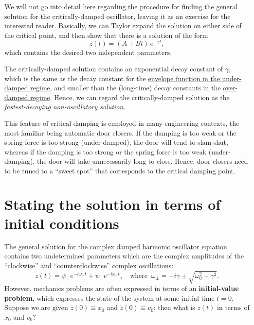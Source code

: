 \documentclass[10pt,a4paper]{article}
\begin{document}
We will not go into detail here regarding the procedure for finding
the general solution for the critically-damped oscillator, leaving it
as an exercise for the interested reader.  Basically, we can Taylor
expand the solution on either side of the critical point, and then
show that there is a solution of the form
\begin{equation}
  z(t) = \left(A + B t\right)\, e^{-\gamma t},
\end{equation}
which contains the desired two independent parameters.

The critically-damped solution contains an exponential decay constant
of $\gamma$, which is the same as the decay constant for the
\hyperref[under-damped-motion]{envelope function in the under-damped
  regime}, and smaller than the (long-time) decay constants in the
\hyperref[over-damped-motion]{over-damped regime}. Hence, we can
regard the critically-damped solution as the \emph{fastest-decaying
  non-oscillatory solution}.

This feature of critical damping is employed in many engineering
contexts, the most familiar being automatic door closers. If the
damping is too weak or the spring force is too strong (under-damped),
the door will tend to slam shut, whereas if the damping is too strong
or the spring force is too weak (under-damping), the door will take
unnecessarily long to close. Hence, door closers need to be tuned to a
``sweet spot'' that corresponds to the critical damping point.

\section{Stating the solution in terms of initial conditions}
\label{initial-conditions}

The \hyperref[general-solution]{general solution for the complex
  damped harmonic oscillator equation} contains two undetermined
parameters which are the complex amplitudes of the ``clockwise'' and
``counterclockwise'' complex oscillations:
\begin{equation}
z(t) = \psi_+ e^{-i\omega_+ t} + \psi_- e^{-i\omega_- t}, \quad\mathrm{where} \;\; \omega_\pm =  -i\gamma  \pm \sqrt{\omega_0^2 - \gamma^2}.
\end{equation}
However, mechanics problems are often expressed in terms of an
\textbf{initial-value problem}, which expresses the state of the
system at some initial time $t = 0$. Suppose we are given $z(0) \equiv
x_0$ and $\dot{z}(0) \equiv v_0$; then what is $z(t)$ in terms of
$x_0$ and $v_0$?
\end{document}
